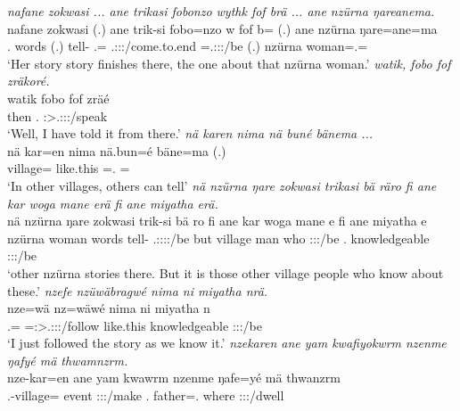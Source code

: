 \begin{exe}
	\emph{nafane zokwasi ... ane trikasi fobonzo wythk fof brä ... ane nzürna ŋareanema.}\\
	\gll nafane zokwasi (.) ane trik-si fobo=nzo w fof b= (.) ane nzürna ŋare=ane=ma\\
	\Tsg.{\Poss} words (.) {\Dem} tell-{\Nmlz} \Dist.\All={\Only} \Tsg.\F:\Sbj:\Nonpast:\Ipfv/come.to.end {\Emph} \Med=\Tsg.\F:\Sbj:\Nonpast:\Ipfv/be (.) {\Dem} nzürna woman=\Poss.\Sg={\Char}\\
	\trans `Her story story finishes there, the one about that nzürna woman.'
	\emph{watik, fobo fof zräkoré.}\\
	\gll watik fobo fof zräé\\
	then \Dist.{\All} {\Emph} \Fsg:\Sbj>\Tsg.\F:\Obj:\Irr:\Pfv/speak\\
	\trans `Well, I have told it from there.'
	\emph{nä karen nima nä buné bänema ...}\\
	\gll nä kar=en nima {nä.bun=é} bäne=ma (.)\\
	{\Indf} village={\Loc} like.this \Indf=\Erg.{\Nsg} \Recog={\Char}\\
	\trans `In other villages, others can tell'
	\emph{nä nzürna ŋare zokwasi trikasi bä räro fi ane kar woga mane erä fi ane miyatha erä.}\\
	\gll nä nzürna ŋare zokwasi trik-si bä ro fi ane kar woga mane e fi ane miyatha e\\
	{\Indf} nzürna woman words tell-{\Nmlz} \Med{} \Tsg.\F:\Sbj:\Nonpast:\Ipfv:\Andat/be but {\Dem} village man who \Stpl:\Sbj:\Nonpast:\Ipfv/be \Third.{\Abs} {\Dem} knowledgeable \Stpl:\Sbj:\Nonpast:\Ipfv/be\\
	\trans `other nzürna stories there. But it is those other village people who know about these.'
\newpage 	
{}
	\emph{nzefe nzüwäbragwé nima ni miyatha nrä.}\\
	\gll nze=wä nz=wäwé nima ni miyatha n\\
	\Fsg.\Erg={\Emph} \Immpst=\Fsg:\Sbj>\Tsg.\F:\Obj:\Nonpast:\Ipfv/follow like.this {\Fnsg} knowledgeable \Fpl:\Sbj:\Nonpast:\Ipfv/be\\
	\trans `I just followed the story as we know it.'
	\emph{nzekaren ane yam kwafiyokwrm nzenme ŋafyé mä thwamnzrm.}\\
	\gll nze-kar=en ane yam kwawrm nzenme ŋafe=yé mä thwanzrm\\
	\Fnsg.\Poss-village={\Loc} {\Dem} event \Sg:\Sbj:\Pst:\Dur/make \Fnsg.{\Poss} father=\Abs.{\Nsg} where \Stpl:\Sbj:\Pst:\Dur/dwell\\

\end{exe}
